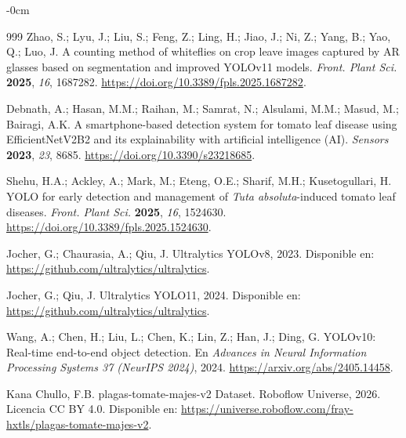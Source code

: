 \documentclass[sensors,article,submit,pdftex,moreauthors]{Definitions/mdpi}
\begin{document}
\begin{adjustwidth}{-\extralength}{0cm}
\begin{thebibliography}{999}
{\color{blue} Zhao, S.; Lyu, J.; Liu, S.; Feng, Z.; Ling, H.; Jiao, J.; Ni, Z.; Yang, B.; Yao, Q.; Luo, J. A counting method of whiteflies on crop leave images captured by AR glasses based on segmentation and improved YOLOv11 models. {\em Front. Plant Sci.} {\bf 2025}, {\em 16}, 1687282. \url{https://doi.org/10.3389/fpls.2025.1687282}.}

{\color{blue} Debnath, A.; Hasan, M.M.; Raihan, M.; Samrat, N.; Alsulami, M.M.; Masud, M.; Bairagi, A.K. A smartphone-based detection system for tomato leaf disease using EfficientNetV2B2 and its explainability with artificial intelligence (AI). {\em Sensors} {\bf 2023}, {\em 23}, 8685. \url{https://doi.org/10.3390/s23218685}.}

{\color{blue} Shehu, H.A.; Ackley, A.; Mark, M.; Eteng, O.E.; Sharif, M.H.; Kusetogullari, H. YOLO for early detection and management of \emph{Tuta absoluta}-induced tomato leaf diseases. {\em Front. Plant Sci.} {\bf 2025}, {\em 16}, 1524630. \url{https://doi.org/10.3389/fpls.2025.1524630}.}

Jocher, G.; Chaurasia, A.; Qiu, J. Ultralytics YOLOv8, 2023. Disponible en: \url{https://github.com/ultralytics/ultralytics}.

Jocher, G.; Qiu, J. Ultralytics YOLO11, 2024. Disponible en: \url{https://github.com/ultralytics/ultralytics}.

Wang, A.; Chen, H.; Liu, L.; Chen, K.; Lin, Z.; Han, J.; Ding, G. YOLOv10: Real-time end-to-end object detection. En {\em Advances in Neural Information Processing Systems 37 (NeurIPS 2024)}, 2024. \url{https://arxiv.org/abs/2405.14458}.

{\color{blue} Kana Chullo, F.B. plagas-tomate-majes-v2 Dataset. Roboflow Universe, 2026. Licencia CC BY 4.0. Disponible en: \url{https://universe.roboflow.com/fray-hxtls/plagas-tomate-majes-v2}.}

\end{thebibliography}
\end{adjustwidth}
\end{document}
